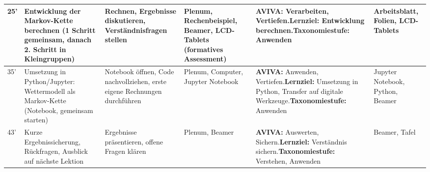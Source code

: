\begin{landscape}
\begin{longtable}{@{}l|p{5cm}|p{5cm}|p{4cm}|p{5cm}|p{5cm}@{}}
            25' & Entwicklung der Markov-Kette berechnen (1 Schritt gemeinsam, danach 2. Schritt in Kleingruppen) & Rechnen, Ergebnisse diskutieren, Verständnisfragen stellen & Plenum, Rechenbeispiel, Beamer, \textbf{LCD-Tablets (formatives Assessment)} & \textbf{AVIVA:} Verarbeiten, Vertiefen.\newline\textbf{Lernziel:} Entwicklung berechnen.\newline\textbf{Taxonomiestufe:} Anwenden & Arbeitsblatt, Folien, LCD-Tablets \\\midrule

            35' & Umsetzung in Python/Jupyter: Wettermodell als Markov-Kette (Notebook, gemeinsam starten) & Notebook öffnen, Code nachvollziehen, erste eigene Rechnungen durchführen & Plenum, Computer, Jupyter Notebook & \textbf{AVIVA:} Anwenden, Vertiefen.\newline\textbf{Lernziel:} Umsetzung in Python, Transfer auf digitale Werkzeuge.\newline\textbf{Taxonomiestufe:} Anwenden & Jupyter Notebook, Python, Beamer \\\midrule

            43' & Kurze Ergebnissicherung, Rückfragen, Ausblick auf nächste Lektion & Ergebnisse präsentieren, offene Fragen klären & Plenum, Beamer & \textbf{AVIVA:} Auswerten, Sichern.\newline\textbf{Lernziel:} Verständnis sichern.\newline\textbf{Taxonomiestufe:} Verstehen, Anwenden & Beamer, Tafel \\\midrule
        \end{longtable}




\end{landscape}
